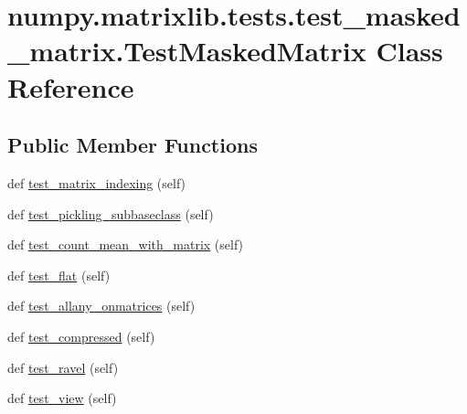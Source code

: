 \hypertarget{classnumpy_1_1matrixlib_1_1tests_1_1test__masked__matrix_1_1TestMaskedMatrix}{}\section{numpy.\+matrixlib.\+tests.\+test\+\_\+masked\+\_\+matrix.\+Test\+Masked\+Matrix Class Reference}
\label{classnumpy_1_1matrixlib_1_1tests_1_1test__masked__matrix_1_1TestMaskedMatrix}
\subsection*{Public Member Functions}
\begin{DoxyCompactItemize}
\item 
def \hyperlink{classnumpy_1_1matrixlib_1_1tests_1_1test__masked__matrix_1_1TestMaskedMatrix_ab812bf9597fb1f0ed72f1d1fb63e4cce}{test\+\_\+matrix\+\_\+indexing} (self)
\item 
def \hyperlink{classnumpy_1_1matrixlib_1_1tests_1_1test__masked__matrix_1_1TestMaskedMatrix_adacaa227ea785b016e6294c4863c164d}{test\+\_\+pickling\+\_\+subbaseclass} (self)
\item 
def \hyperlink{classnumpy_1_1matrixlib_1_1tests_1_1test__masked__matrix_1_1TestMaskedMatrix_a94999c13eba4360fd1d13c8137884812}{test\+\_\+count\+\_\+mean\+\_\+with\+\_\+matrix} (self)
\item 
def \hyperlink{classnumpy_1_1matrixlib_1_1tests_1_1test__masked__matrix_1_1TestMaskedMatrix_a547ca01f53bfe37c43717bfd5776e4cc}{test\+\_\+flat} (self)
\item 
def \hyperlink{classnumpy_1_1matrixlib_1_1tests_1_1test__masked__matrix_1_1TestMaskedMatrix_a88374490d272bde265f58baba69c754b}{test\+\_\+allany\+\_\+onmatrices} (self)
\item 
def \hyperlink{classnumpy_1_1matrixlib_1_1tests_1_1test__masked__matrix_1_1TestMaskedMatrix_ad1bc64c43e21b4cf6291659da62233a8}{test\+\_\+compressed} (self)
\item 
def \hyperlink{classnumpy_1_1matrixlib_1_1tests_1_1test__masked__matrix_1_1TestMaskedMatrix_a657e9c777949a847e4e5869dbbabcee0}{test\+\_\+ravel} (self)
\item 
def \hyperlink{classnumpy_1_1matrixlib_1_1tests_1_1test__masked__matrix_1_1TestMaskedMatrix_a56913a9dfeec71f980a67e5e6d8eba08}{test\+\_\+view} (self)
\end{DoxyCompactItemize}


